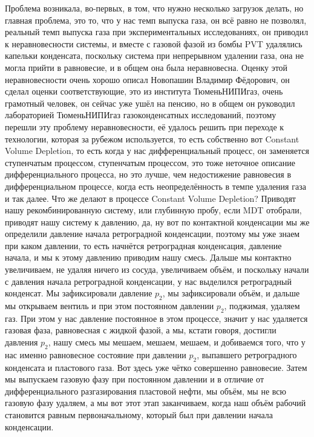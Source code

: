 \documentclass[main.tex]{subfiles}
\begin{document}
Проблема возникала, во-первых, в том, что нужно несколько загрузок делать, но главная проблема, это то, что у нас темп выпуска газа, он всё равно не позволял, реальный темп выпуска газа при экспериментальных исследованиях, он приводил к неравновесности системы, и вместе с газовой фазой из бомбы PVT удалялись капельки конденсата, поскольку система при непрерывном удалении газа, она не могла прийти в равновесие, и в общем она была неравновесна.
Оценку этой неравновесности очень хорошо описал Новопашин Владимир Фёдорович, он сделал оценки соответствующие, это из института ТюменьНИПИгаз, очень грамотный человек, он сейчас уже ушёл на пенсию, но в общем он руководил лабораторией ТюменьНИПИгаз газоконденсатных исследований, поэтому перешли эту проблему неравновесности, её удалось решить при переходе к технологии, которая за рубежом используется, то есть собственно вот Constant Volume Depletion, то есть когда у нас дифференциальный процесс, он заменяется ступенчатым процессом, ступенчатым процессом, это тоже неточное описание дифференциального процесса, но это лучше, чем недостижение равновесия в дифференциальном процессе, когда есть неопределённость в темпе удаления газа и так далее.
Что же делают в процессе Constant Volume Depletion?
Приводят нашу рекомбинированную систему, или глубинную пробу, если MDT отобрали, приводят нашу систему к давлению, да, ну вот по контактной конденсации мы же определили давление начала ретроградной конденсации, поэтому мы уже знаем при каком давлении, то есть начнётся ретроградная конденсация, давление начала, и мы к этому давлению приводим нашу смесь.
Дальше мы контактно увеличиваем, не удаляя ничего из сосуда, увеличиваем объём, и поскольку начали с давления начала ретроградной конденсации, у нас выделился ретроградный конденсат.
Мы зафиксировали давление $p_2$, мы зафиксировали объём, и дальше мы открываем вентиль и при этом постоянном давлении $p_2$, поджимая, удаляем газ.
При этом у нас давление постоянное в этом процессе, значит у нас удаляется газовая фаза, равновесная с жидкой фазой, а мы, кстати говоря, достигли давления $p_2$, нашу смесь мы мешаем, мешаем, мешаем, и добиваемся того, что у нас именно равновесное состояние при давлении $p_2$, выпавшего ретроградного конденсата и пластового газа.
Вот здесь уже чётко совершенно равновесие.
Затем мы выпускаем газовую фазу при постоянном давлении и в отличие от дифференциального разгазирования пластовой нефти, мы объём, мы не всю газовую фазу удаляем, а мы вот этот этап заканчиваем, когда наш объём рабочий становится равным первоначальному, который был при давлении начала конденсации.
\end{document}
